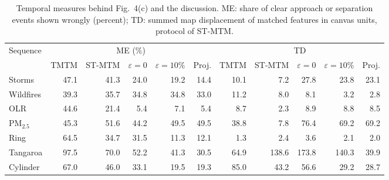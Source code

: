 \begin{table}[H]
\centering\small\setlength{\tabcolsep}{3.2pt}
\caption{Temporal measures behind Fig.~4(c) and the discussion. ME: share of clear approach or separation events shown wrongly (percent); TD: summed map displacement of matched features in canvas units, protocol of ST-MTM.}\label{tab:supp_values_temporal}
\begin{tabular}{lrrrrrrrrrr}\toprule
Sequence & \multicolumn{5}{c}{ME (\%)} & \multicolumn{5}{c}{TD}\\\cmidrule(lr){2-6}\cmidrule(lr){7-11}
 & TMTM & ST-MTM & $\varepsilon{=}0$ & $\varepsilon{=}10\%$ & Proj. & TMTM & ST-MTM & $\varepsilon{=}0$ & $\varepsilon{=}10\%$ & Proj.\\\midrule
Storms & 47.1 & 41.3 & 24.0 & 19.2 & 14.4 & 10.1 & 7.2 & 27.8 & 23.8 & 23.1\\
Wildfires & 39.3 & 35.7 & 34.8 & 34.8 & 33.0 & 11.2 & 8.0 & 8.1 & 3.2 & 2.8\\
OLR & 44.6 & 21.4 & 5.4 & 7.1 & 5.4 & 8.7 & 2.3 & 8.9 & 8.8 & 8.5\\
PM$_{2.5}$ & 45.3 & 51.6 & 44.2 & 49.5 & 49.5 & 38.8 & 7.8 & 76.4 & 69.2 & 69.2\\
Ring & 64.5 & 34.7 & 31.5 & 11.3 & 12.1 & 1.3 & 2.4 & 3.6 & 2.1 & 2.0\\
Tangaroa & 97.5 & 70.0 & 52.2 & 41.3 & 30.5 & 64.9 & 138.6 & 173.8 & 140.3 & 39.9\\
Cylinder & 67.0 & 46.0 & 33.1 & 19.5 & 19.3 & 85.0 & 43.2 & 56.6 & 29.2 & 28.7\\
\bottomrule\end{tabular}
\end{table}
